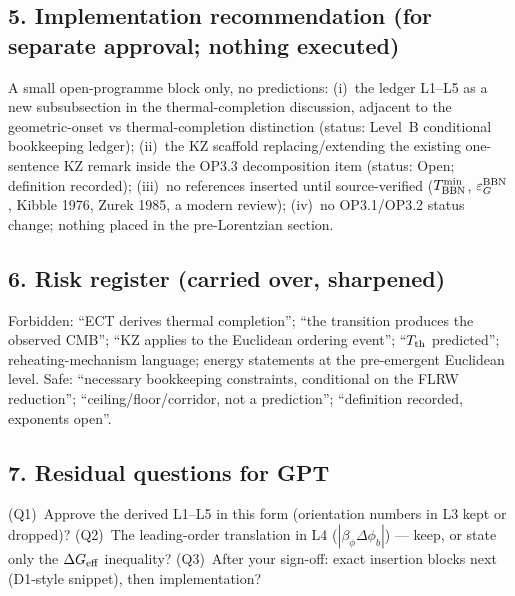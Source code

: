 \subsection*{5. Implementation recommendation (for separate
approval; nothing executed)}
A small open-programme block only, no predictions:
(i)~the ledger L1--L5 as a new subsubsection in the
thermal-completion discussion, adjacent to the geometric-onset vs
thermal-completion distinction (status: Level~B conditional
bookkeeping ledger);
(ii)~the KZ scaffold replacing/extending the existing one-sentence
KZ remark inside the OP3.3 decomposition item (status: Open;
definition recorded);
(iii)~no references inserted until source-verified
($T^{\min}_{\rm BBN}$, $\varepsilon_G^{\rm BBN}$, Kibble 1976,
Zurek 1985, a modern review);
(iv)~no OP3.1/OP3.2 status change; nothing placed in the
pre-Lorentzian section.

\subsection*{6. Risk register (carried over, sharpened)}
Forbidden: ``ECT derives thermal completion'';
``the transition produces the observed CMB'';
``KZ applies to the Euclidean ordering event'';
``$T_{\rm th}$ predicted''; reheating-mechanism language;
energy statements at the pre-emergent Euclidean level.
Safe: ``necessary bookkeeping constraints, conditional on the FLRW
reduction''; ``ceiling/floor/corridor, not a prediction'';
``definition recorded, exponents open''.

\subsection*{7. Residual questions for GPT}
(Q1)~Approve the derived L1--L5 in this form (orientation numbers
in L3 kept or dropped)?
(Q2)~The leading-order translation in L4
($|\beta_\phi\Delta\phi_b|$) --- keep, or state only the
$\Delta G_{\rm eff}$ inequality?
(Q3)~After your sign-off: exact insertion blocks next (D1-style
snippet), then implementation?
